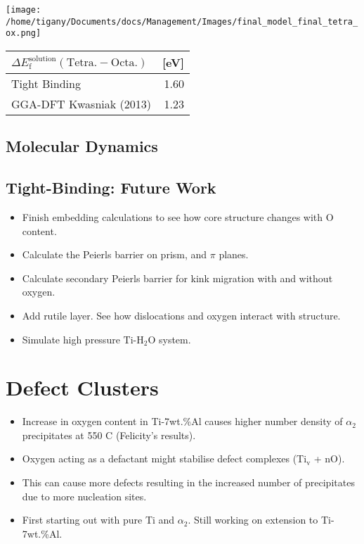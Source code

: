 \documentclass[11pt]{article}
\begin{document}
\begin{center}
\texttt{[image: /home/tigany/Documents/docs/Management/Images/final\_model\_final\_tetra\_ox.png]}
\end{center}

\begin{center}
\begin{tabular}{lr}
\(\Delta E_{\text{f}}^{\text{solution}}(\text{Tetra.} - \text{Octa.} )\) & [eV]\\
\hline
Tight Binding & 1.60\\
GGA-DFT Kwasniak (2013) & 1.23\\
\hline
\end{tabular}
\end{center}


\subsection*{Molecular Dynamics}
\label{sec:orgd9d62d6}


\subsection*{Tight-Binding: Future Work}
\label{sec:org7f39612}
\begin{itemize}
\item Finish embedding calculations to see how core structure changes
with O content.
\item Calculate the Peierls barrier on prism, and \(\pi\) planes.
\item Calculate secondary Peierls barrier for kink migration with and without
oxygen.
\item Add rutile layer. See how dislocations and oxygen interact with structure.
\item Simulate high pressure \(\text{Ti-H}_{2}\text{O}\) system.
\end{itemize}


\section*{Defect Clusters}
\label{sec:org8562cf4}

\begin{itemize}
\item Increase in oxygen content in Ti-7wt.\%Al causes higher number density of
\(\alpha_2\) precipitates at 550\textdegree{} C (Felicity's results).
\item Oxygen acting as a defactant might stabilise defect complexes (Ti\(_{\text{v}}\) + nO).
\item This can cause more defects resulting in the increased number of precipitates due to more nucleation sites.
\item First starting out with pure Ti and \(\alpha_2\). Still working on extension to Ti-7wt.\%Al.
\end{itemize}
\end{document}
